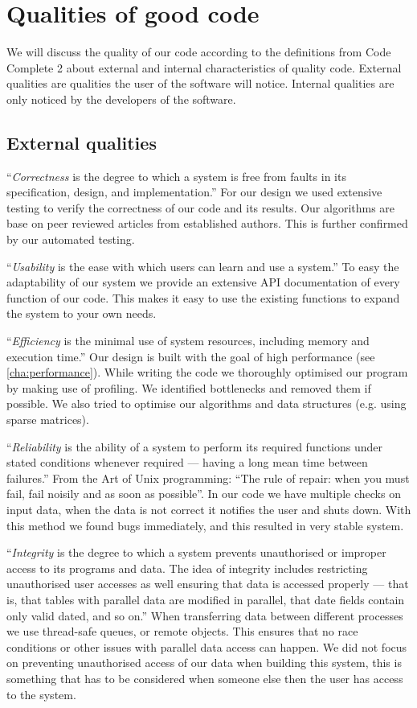 \documentclass[a4paper, openany, oneside]{memoir}
\begin{document}
\section{Qualities of good code}
We will discuss the quality of our code according to the definitions from Code Complete 2 about external and internal characteristics of quality code. External qualities are qualities the user of the software will notice. Internal qualities are only noticed by the developers of the software.\cite{mcconnell2004code}

\subsection{External qualities}
``\textit{Correctness} is the degree to which a system is free from faults in its specification, design, and implementation.'' For our design we used extensive testing to verify the correctness of our code and its results. Our algorithms are base on peer reviewed articles from established authors. This is further confirmed by our automated testing.

``\textit{Usability} is the ease with which users can learn and use a system.'' To easy the adaptability of our system we provide an extensive API documentation of every function of our code. This makes it easy to use the existing functions to expand the system to your own needs.

``\textit{Efficiency} is the minimal use of system resources, including memory and execution time.'' Our design is built with the goal of high performance (see \cref{cha:performance}). While writing the code we thoroughly optimised our program by making use of profiling. We identified bottlenecks and removed them if possible. We also tried to optimise our algorithms and data structures (e.g. using sparse matrices).

``\textit{Reliability} is the ability of a system to perform its required functions under stated conditions whenever required --- having a long mean time between failures.'' From the Art of Unix programming\cite{raymond2003art}: ``The rule of repair: when you must fail, fail noisily and as soon as possible''. In our code we have multiple checks on input data, when the data is not correct it notifies the user and shuts down. With this method we found bugs immediately, and this resulted in very stable system.

``\textit{Integrity} is the degree to which a system prevents unauthorised or improper access to its programs and data. The idea of integrity includes restricting unauthorised user accesses as well ensuring that data is accessed properly --- that is, that tables with parallel data are modified in parallel, that date fields contain only valid dated, and so on.'' When transferring data between different processes we use thread-safe queues, or remote objects. This ensures that no race conditions or other issues with parallel data access can happen. We did not focus on preventing unauthorised access of our data when building this system, this is something that has to be considered when someone else then the user has access to the system.
\end{document}
